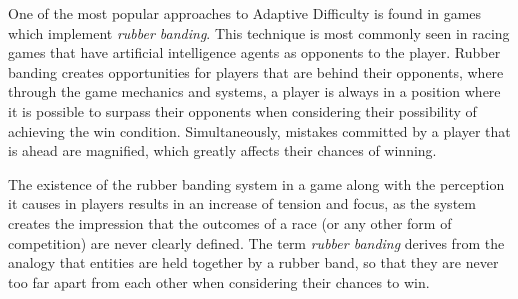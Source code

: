 










One of the most popular approaches to Adaptive Difficulty is found in games which implement \emph{rubber banding}. This technique is most commonly seen in racing games that have artificial intelligence agents as opponents to the player. Rubber banding creates opportunities for players that are behind their opponents, where through the game mechanics and systems, a player is always in a position where it is possible to surpass their opponents when considering their possibility of achieving the win condition. Simultaneously, mistakes committed by a player that is ahead are magnified, which greatly affects their chances of winning.

The existence of the rubber banding system in a game along with the perception it causes in players results in an increase of tension and focus, as the system creates the impression that the outcomes of a race (or any other form of competition) are never clearly defined. The term \emph{rubber banding} derives from the analogy that entities are held together by a rubber band, so that they are never too far apart from each other when considering their chances to win.

